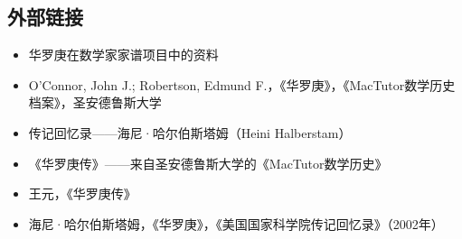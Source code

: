 \subsection{外部链接}
\begin{itemize}
\item 华罗庚在数学家家谱项目中的资料  
\item O'Connor, John J.; Robertson, Edmund F.，《华罗庚》，《MacTutor数学历史档案》，圣安德鲁斯大学  
\item 传记回忆录——海尼·哈尔伯斯塔姆（Heini Halberstam）  
\item 《华罗庚传》——来自圣安德鲁斯大学的《MacTutor数学历史》  
\item 王元，《华罗庚传》  
\item 海尼·哈尔伯斯塔姆，《华罗庚》，《美国国家科学院传记回忆录》（2002年）
\end{itemize}